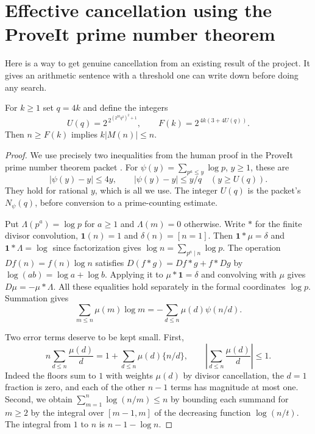 \section{Effective cancellation using the ProveIt prime number theorem}\label{sec:cancellation}

Here is a way to get genuine cancellation from an existing result of the project. It gives an arithmetic sentence with a threshold one can write down before doing any search.

\begin{theorem}\label{thm:cancellation}
For $k\ge1$ set $q=4k$ and define the integers
\[
 U(q)=2^{\,2^{(2^{20}q^3)^2+1}},\qquad
 F(k)=2^{\,4k(3+4U(q))}.
\]
Then $n\ge F(k)$ implies $k|M(n)|\le n$.
\end{theorem}
\begin{proof}
We use precisely two inequalities from the human proof in the ProveIt prime number theorem packet \cite{pnt}. For $\psi(y)=\sum_{p^a\le y}\log p$, $y\ge1$, these are
\[
 |\psi(y)-y|\le 4y,\qquad |\psi(y)-y|\le y/q\quad (y\ge U(q)).
\]
They hold for rational $y$, which is all we use. The integer $U(q)$ is the packet's $N_\psi(q)$, before conversion to a prime-counting estimate.

Put $\Lambda(p^a)=\log p$ for $a\ge1$ and $\Lambda(m)=0$ otherwise. Write $*$ for the finite divisor convolution, $\mathbf1(n)=1$ and $\delta(n)=[n=1]$. Then $\mathbf1*\mu=\delta$ and $\mathbf1*\Lambda=\log$ since factorization gives $\log n=\sum_{p^a\mid n}\log p$. The operation $Df(n)=f(n)\log n$ satisfies $D(f*g)=Df*g+f*Dg$ by $\log(ab)=\log a+\log b$. Applying it to $\mu*\mathbf1=\delta$ and convolving with $\mu$ gives $D\mu=-\mu*\Lambda$. All these equalities hold separately in the formal coordinates $\log p$. Summation gives
\[
 \sum_{m\le n}\mu(m)\log m=-\sum_{d\le n}\mu(d)\psi(n/d).
\]

Two error terms deserve to be kept small. First,
\[
 n\sum_{d\le n}\frac{\mu(d)}d
 =1+\sum_{d\le n}\mu(d)\{n/d\},\qquad
 \left|\sum_{d\le n}\frac{\mu(d)}d\right|\le1 .
\]
Indeed the floors sum to $1$ with weights $\mu(d)$ by divisor cancellation, the $d=1$ fraction is zero, and each of the other $n-1$ terms has magnitude at most one. Second,
we obtain $\sum_{m=1}^n\log(n/m)\le n$ by bounding each summand for $m\ge2$ by the integral over $[m-1,m]$ of the decreasing function $\log(n/t)$. The integral from $1$ to $n$ is $n-1-\log n$.


\end{proof}
